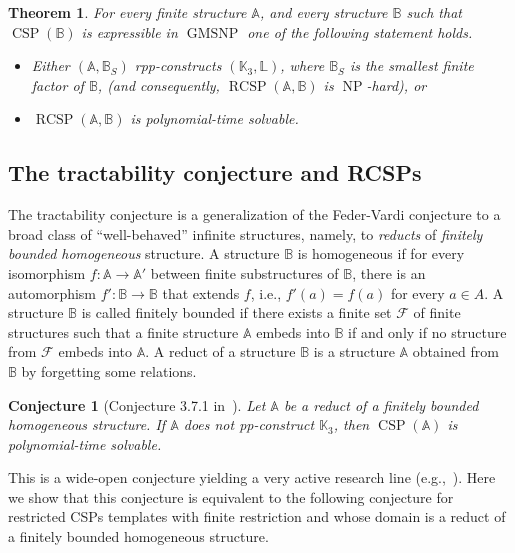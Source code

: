 \documentclass{article}
\newtheorem{theorem}{Theorem}
\newtheorem{conjecture}{Conjecture}
\theoremstyle{definition}
\theoremstyle{remark}
\DeclareMathOperator{\NP}{NP}
\DeclareMathOperator{\CSP}{CSP}
\DeclareMathOperator{\RCSP}{RCSP}
\DeclareMathOperator{\GMSNP}{GMSNP}
\newcommand{\bA}{{\mathbb A}}
\newcommand{\bB}{{\mathbb B}}
\newcommand{\bK}{{\mathbb K}}
\newcommand{\bL}{{\mathbb L}}
\begin{document}
\begin{theorem}\label{lem:GMSNP-restrictions}
    For every finite structure $\bA$, and every structure $\bB$ such that $\CSP(\bB)$ 
    is expressible in $\GMSNP$ one of the following statement holds.
    \begin{itemize}
        \item Either $(\bA,\bB_S)$ rpp-constructs $(\bK_3,\bL)$, where $\bB_S$ is the smallest
        finite factor of $\bB$, (and consequently, $\RCSP(\bA,\bB)$ is $\NP$-hard), or
        \item $\RCSP(\bA,\bB)$ is polynomial-time solvable. 
    \end{itemize}
\end{theorem}


\subsection{The tractability conjecture and RCSPs}

The tractability conjecture is a generalization of the Feder-Vardi conjecture to a broad class
of  ``well-behaved'' infinite structures, namely, to \emph{reducts} of
\emph{finitely bounded homogeneous} structure. A structure $\bB$ is homogeneous if for
every isomorphism $f\colon \bA \to\bA'$ between finite substructures of $\bB$, there is
an automorphism  $f'\colon \bB\to \bB$ that extends $f$,  i.e., $f'(a) = f(a)$ for every
$a\in A$. A structure $\bB$ is called finitely bounded  if there exists a finite set
${\mathcal F}$ of finite structures such that a finite structure $\bA$ embeds into $\bB$
if and only if no structure from ${\mathcal F}$ embeds into $\bA$. A reduct
of a structure $\bB$ is a structure $\bA$ obtained from $\bB$ by forgetting some relations.

\begin{conjecture}
[Conjecture 3.7.1 in~\cite{Book}]
\label{conj:tractability}
Let $\bA$ be a reduct of a finitely bounded homogeneous structure. If $\bA$ does not pp-construct
$\bK_3$, then $\CSP(\bA)$ is polynomial-time solvable. 
\end{conjecture}

This is a wide-open conjecture yielding a very active research line (e.g.,~\cite{wonderland,BKOPP,BartoPinskerDichotomy,Book,BodirskyBodorUIP,BodDalJournal,Pinsker22}).
Here we show that this conjecture is equivalent to the following conjecture for restricted CSPs
templates with finite restriction and whose domain is a reduct of a finitely bounded homogeneous structure.
\end{document}
